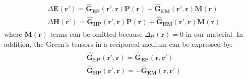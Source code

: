 \begin{align}\label{eq:scatter_field}
\begin{split}
&\Delta\bm{E(\bm{r'})} = \bm{\hat{G}_{EP}}(\bm{r'},\bm{r})\bm{P(r)} +\bm{\hat{G}_{EM}}(\bm{r'},\bm{r})\bm{M(r)} \\
&\Delta\bm{H(\bm{r'})} = \bm{\hat{G}_{HP}}(\bm{r'},\bm{r})\bm{P(r)}+\bm{\hat{G}_{HM}}(\bm{r'},\bm{r})\bm{M(r)}
\end{split}
\end{align}
where $\bm{M(r)}$ terms can be omitted because $\Delta \mu(\bm{r}) = 0$ in our material.
In addition, the Green's tensors in a reciporcal medium can be expressed by:
\begin{align}\label{eq:green_tensor}
\begin{split}
&\bm{\hat{G}_{EP}}(\bm{r'},\bm{r})= \bm{\hat{G}_{EP}}(\bm{r},\bm{r'})\\ 
&\bm{\hat{G}_{HP}}(\bm{r'},\bm{r})= -\bm{\hat{G}_{EM}}(\bm{r},\bm{r'})
\end{split}
\end{align}

